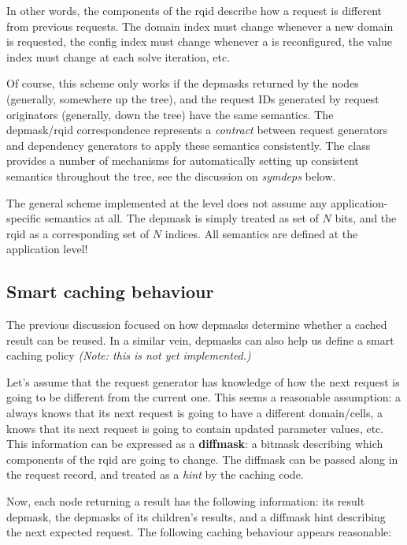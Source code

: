   In other words, the components of the rqid describe how a request is
  different from previous requests. The domain index must change whenever a new
  domain is requested, the config index must change whenever a  is
  reconfigured, the value index must change at each solve iteration, etc.

  Of course, this scheme only works if the depmasks returned by the nodes
  (generally, somewhere up the tree), and the request IDs generated by request
  originators (generally, down the tree) have the same semantics. The
  depmask/rqid correspondence represents a {\em contract} between request
  generators and dependency generators to apply these semantics consistently.
  The  class provides a number of mechanisms for automatically setting
  up consistent semantics throughout the tree, see the discussion on {\em
  symdeps} below.

  The general scheme implemented at the  level does not assume any
  application-specific semantics at all. The depmask is simply treated as set of $N$
  bits, and the rqid as a corresponding set of $N$ indices. All semantics are
  defined at the application level!

\subsection{Smart caching behaviour}
  \label{sec:smartcache}
  \label{sec:nextreq}

  The previous discussion focused on how depmasks determine whether a cached
  result can be reused. In a similar vein, depmasks can also help us define a
  smart caching policy {\em (Note: this is not yet implemented.)}
  
  Let's assume that the request generator has knowledge of how the next request
  is going to be different from the current one. This seems a reasonable
  assumption: a  always knows that its next request is going to have a
  different domain/cells, a  knows that its next request is going to
  contain updated parameter values, etc. This information can be expressed as a
  {\bf diffmask}: a bitmask describing which components of the rqid are going
  to change. The diffmask can be passed along in the request record, and
  treated as a {\em hint} by the caching code.

  Now, each node returning a result has the following information: its result
  depmask, the depmasks of its children's results, and a diffmask hint 
  describing the next expected request. The following caching behaviour appears reasonable:
  
